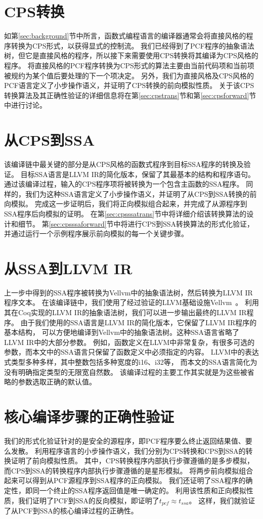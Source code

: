 \section{CPS转换}

如第\ref{sec:background}节中所言，函数式编程语言的编译器通常会将直接风格的程序转换为CPS形式，以获得显式的控制流。
我们已经得到了PCF程序的抽象语法树，但它是直接风格的程序，所以接下来需要使用CPS转换将其编译为CPS风格的程序。
将直接风格的PCF程序转换为CPS形式的算法主要由当前代码项和当前项被规约为某个值后要处理的下一个项决定。
另外，我们为直接风格及CPS风格的PCF语言定义了小步操作语义，并证明了CPS转换的前向模拟性质。
关于该CPS转换算法及其正确性验证的详细信息将在第\ref{sec:cpstrans}节和第\ref{sec:cpsforward}节中进行讨论。

\section{从CPS到SSA}

该编译链中最关键的部分是从CPS风格的函数式程序到目标SSA程序的转换及验证。
目标SSA语言是LLVM IR的简化版本，保留了其最基本的结构和程序语句。
通过该编译过程，输入的CPS程序项将被转换为一个包含主函数的SSA程序。
同样的，我们为这种SSA语言定义了小步操作语义，并证明了从CPS到SSA转换的前向模拟。
完成这一步证明后，我们将正向模拟组合起来，并完成了从源程序到SSA程序后向模拟的证明。
在第\ref{sec:cpsssatrans}节中将详细介绍该转换算法的设计和细节。
第\ref{sec:cpsssaforward}节中将进行CPS到SSA转换算法的形式化验证，并通过运行一个示例程序展示前向模拟的每一个关键步骤。

\section{从SSA到LLVM IR}

上一步中得到的SSA程序被转换为Vellvm中的抽象语法树，然后转换为LLVM IR程序文本。
在该编译链中，我们使用了经过验证的LLVM基础设施Vellvm~\cite{zakowski2021modular}。
利用其在Coq实现的LLVM IR的抽象语法树，我们可以进一步输出最终的LLVM IR程序。
由于我们使用的SSA语言是LLVM IR的简化版本，它保留了LLVM IR程序的基本结构，
可以方便地编译到Vellvm中的抽象语法树。这种SSA语言省略了LLVM IR中的大部分参数。
例如，函数定义在LLVM中非常复杂，有很多可选的参数，而本文中的SSA语言只保留了函数定义中必须指定的内容。
LLVM中的表达式类型多种多样，其中整数包括多种宽度的i16、i32等，
而本文的SSA语言简化为没有明确指定类型的无限宽自然数。
该编译过程的主要工作其实就是为这些被省略的参数选取正确的默认值。

\section{核心编译步骤的正确性验证}

我们的形式化验证针对的是安全的源程序，即PCF程序要么终止返回结果值、要么发散。
利用程序语言的小步操作语义，我们分别为CPS转换和CPS到SSA的转换证明了前向模拟性质。
其中，CPS转换程序内部执行步骤遵循的是多步模拟，而CPS到SSA的转换程序内部执行步骤遵循的是星形模拟。
将两步前向模拟组合起来可以得到从PCF源程序到SSA程序的正向模拟。
我们还证明了SSA程序的确定性，即同一个终止的SSA程序返回值是唯一确定的。
利用该性质和正向模拟性质，我们证明了PCF到SSA的反向模拟，即证明了$t_{pcf}\approx t_{ssa}$。
这样，我们就验证了从PCF到SSA的核心编译过程的正确性。

